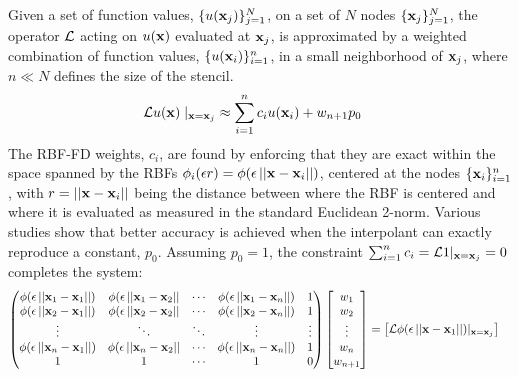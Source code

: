 \documentclass[11pt]{report}
\begin{document}
{Given a set of function values, $\{u(\mathbf{x}_j)\}_{j=1}^{N}$, on a set of $N$ nodes $\{\mathbf{x}_j\}_{j=1}^{N}$, the operator $\diffop$ acting on $u(\mathbf{x})$ evaluated at 
$\mathbf{x}_j$, %
is approximated by a weighted combination of function values, $\{u(\mathbf{x}_i)\}_{i=1}^{n}$, in a small neighborhood of $\mathbf{x}_j$, 
where $n\ll N$ defines the size of the stencil. 
\begin{align}
\mathcal{L}u(\mathbf{x})\mid_{\mathbf{x}=\mathbf{x}_j} &\approx \sum_{i=1}^{n} c_i u(\mathbf{x}_i) + w_{n+1} p_0
\label{eq:derivFromFDWeights}
\end{align}
The RBF-FD weights, ${c_i}$, are found by enforcing that they are exact within the space spanned by the RBFs $\phi_i(\epsilon r) = \phi(\epsilon\left|\left|\mathbf{x}-\mathbf{x}_{i}\right|\right|)$, centered at the nodes $\{\mathbf{x}_i\}_{i=1}^{n}$, with 
$r=\left|\left|\mathbf{x} - \mathbf{x}_i\right|\right|$
being the distance between where the RBF is centered and where it is evaluated as measured in the standard Euclidean 2-norm. Various studies show  \cite{WrightFornberg06,FornbergDriscoll02,FornbergLehto11,FlyerLehto11} that better accuracy is achieved when the 
interpolant can exactly reproduce a constant, $p_0$.  
Assuming $p_0 = 1$, the constraint $\sum_{i=1}^{n}c_i=\mathcal{L}1|_{\mathbf{x}=\mathbf{x}_{j}}=0$ completes the system: 
\begin{align}
\begin{pmatrix}
\phi(\epsilon\left|\left|\mathbf{x}_1-\mathbf{x}_1\right|\right|) & \phi(\epsilon\left|\left|\mathbf{x}_1-\mathbf{x}_2\right|\right| & \cdots & \phi(\epsilon\left|\left|\mathbf{x}_1-\mathbf{x}_n\right|\right|) & 1 \\
\phi(\epsilon\left|\left|\mathbf{x}_2-\mathbf{x}_1\right|\right|) & \phi(\epsilon\left|\left|\mathbf{x}_2-\mathbf{x}_2\right|\right| & \cdots &
\phi(\epsilon\left|\left|\mathbf{x}_2-\mathbf{x}_n\right|\right|) & 1\\
\vdots & \ddots & \ddots & \vdots & \vdots\\
\phi(\epsilon\left|\left|\mathbf{x}_n-\mathbf{x}_1\right|\right|) & \phi(\epsilon\left|\left|\mathbf{x}_n-\mathbf{x}_2\right|\right| & \cdots &
\phi(\epsilon\left|\left|\mathbf{x}_n-\mathbf{x}_n\right|\right|) & 1 \\
1 & 1 & \cdots & 1 & 0
\end{pmatrix}
\begin{bmatrix} w_1 \\ w_2 \\ \vdots \\ w_n  \\ w_{n+1}\end{bmatrix}
&=
\begin{bmatrix} \mathcal{L}\phi(\epsilon\left|\left|\mathbf{x}-\mathbf{x}_{1}\right|\right|)|_{\mathbf{x}=\mathbf{x}_{j}} \\

\end{bmatrix}
\end{align}}
\end{document}

